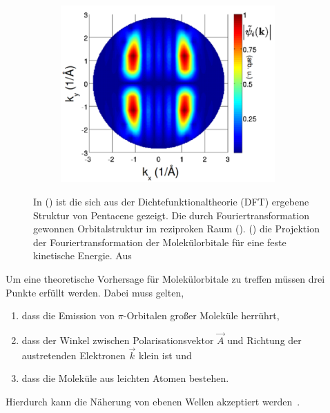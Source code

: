 \begin{figure}
\begin{subfigure}{0.3\textwidth}
                \caption{}
                \label{fig:DFT2}
            \end{subfigure}
            \begin{subfigure}{0.3\textwidth}
                \centering
                \includegraphics[width=0.9\textwidth]{DFT3.PNG}
                \caption{}
                \label{fig:DFT3}
            \end{subfigure}
            \caption{In () ist die sich aus der Dichtefunktionaltheorie (DFT) ergebene Struktur von Pentacene gezeigt.
            Die durch Fouriertransformation gewonnen Orbitalstruktur im reziproken Raum ().
            () die Projektion der Fouriertransformation der Molekülorbitale für eine feste kinetische Energie.
            Aus~\cite{MM_2}}
            \label{fig:DFT}
        \end{figure}
        Um eine theoretische Vorhersage für Molekülorbitale zu treffen müssen drei Punkte erfüllt werden.
        Dabei muss gelten, 
        \begin{enumerate}
            \item dass die Emission von $\pi$-Orbitalen großer Moleküle herrührt,
            \item dass der Winkel zwischen Polarisationsvektor $\vec{A}$ und Richtung der austretenden Elektronen $\vec{k}$ klein ist und
            \item dass die Moleküle aus leichten Atomen bestehen.
        \end{enumerate}
        Hierdurch kann die Näherung von ebenen Wellen akzeptiert werden~\cite{MM_2}.
